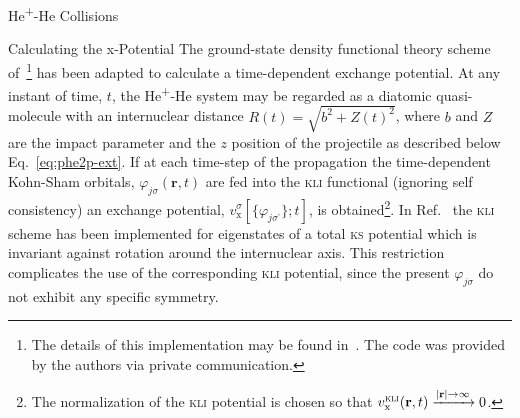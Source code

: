 \documentclass[a5paper, 9 pt]{extreport}
\begin{document}
\begin{chapter}{\texorpdfstring{He\textsuperscript{+}}{He+}-He Collisions \label{chap:hephe}}
\begin{section}{Calculating the x-Potential \label{sec:pot}}
      The ground-state density functional theory scheme of~\cite{diamol}\footnote{The details of this
      implementation may be found in~\cite{diamol}. The code was provided by the authors via private
      communication.} has been adapted to calculate a time-dependent exchange potential. At any instant
      of time, $t$, the He\textsuperscript{+}-He system may be regarded as a diatomic quasi-molecule with
      an internuclear distance $R(t) = \sqrt{b^2 + Z(t)^2}$, where $b$ and $Z$ are the impact parameter
      and the $z$ position of the projectile as described below Eq.~\eqref{eq:phe2p-ext}. If at each
      time-step of the propagation the time-dependent Kohn-Sham orbitals,
      $\varphi_{j \sigma}(\mathbf{r},t)$ are fed into the \textsc{kli} functional (ignoring self
      consistency) an exchange potential, $v^{\sigma}_\mathrm{x}[ \{ \varphi_{j \sigma^\prime} \};t]$,
      is obtained\footnote{The normalization of the \textsc{kli} potential is chosen so that
      $v_\mathrm{x}^\textsc{kli}(\mathbf{r},t) \xrightarrow{\vert \mathbf{r} \vert \to \infty} 0$.}. In
      Ref.~\cite{diamol} the \textsc{kli} scheme has been implemented for eigenstates of a total
      \textsc{ks} potential which is invariant against rotation around the internuclear axis. This
      restriction complicates the use of the corresponding \textsc{kli} potential, since the present
      $\varphi_{j \sigma}$ do not exhibit any specific symmetry.


\end{section}
\end{chapter}
\end{document}
